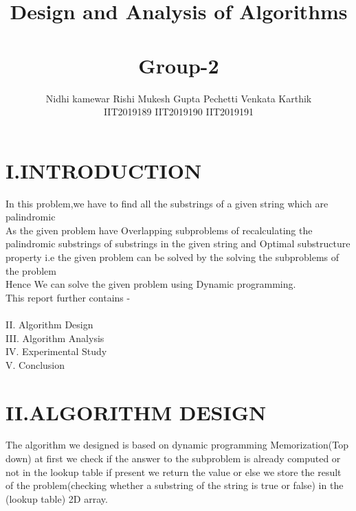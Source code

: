 \documentclass[twocolumn]{article}
\title{\vspace{-2cm} \textbf{{\myfont Design and Analysis of Algorithms}} \\
\\Group-2
}
\author{Nidhi kamewar    \: \: \:  \:     \:                         Rishi Mukesh Gupta          \: \: \:  \:     \:             Pechetti Venkata Karthik\\    

    IIT2019189     \: \: \:  \:     \:   \: \: \:  \:     \:                      IIT2019190     \: \: \:  \:     \: \:  \:    \: \:    \:                  IIT2019191    \: \: \: \:  \:     \:     


}
\begin{document}
\maketitle

\section*{I.INTRODUCTION}
In this problem,we have to find all the substrings of a given string which are palindromic \\

As the given problem have Overlapping subproblems of recalculating the palindromic substrings of substrings in the given string and Optimal substructure property i.e the given problem can be solved by the solving the subproblems of the problem\\

Hence We can solve the given problem using Dynamic programming.\\

This report further contains -\\
\\
II. Algorithm Design \\
III. Algorithm Analysis\\
IV. Experimental Study\\
V. Conclusion\\

\section*{II.ALGORITHM DESIGN
}
\noindent
The algorithm we designed is based on dynamic programming Memorization(Top down) at first we check if the answer to the subproblem is already computed or not in the lookup table if present we return the value or else  we store the result of the problem(checking whether a substring of the string is true or false) in the (lookup table) 2D array.\\
\end{document}
